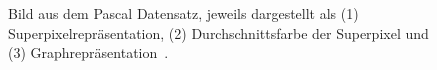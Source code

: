 \begin{figure}[t]
\centering
{}
\caption[\gls{Pascal}]{Bild aus dem \gls{Pascal} Datensatz, jeweils dargestellt als (1) Superpixelrepräsentation, (2) Durchschnittsfarbe der Superpixel und (3) Graphrepräsentation~\cite{pascal_voc}.}
\label{fig:pascal_voc}
\end{figure}
